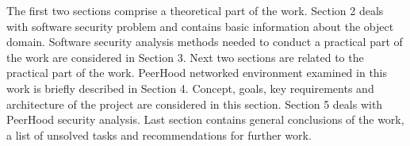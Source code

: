 %
The first two sections comprise a theoretical part of the work. 
%
Section 2 deals with software security problem and contains basic information about the object domain. 
%
Software security analysis methods needed to conduct a practical part of the work are considered in Section 3. 
%
Next two sections are related to the practical part of the work. 
%
PeerHood networked environment examined in this work is briefly described in Section 4. 
%
Concept, goals, key requirements and architecture of the project are considered in this section. 
%
Section 5 deals with PeerHood security analysis. 
%
Last section contains general conclusions of the work, a list of unsolved tasks and recommendations for further work. 